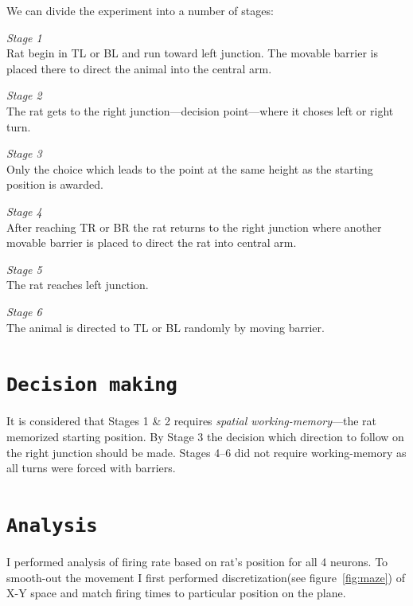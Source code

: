 \documentclass[12pt,a4paper,twocolumn]{article}
\begin{document}
We can divide the experiment into a number of stages:
\begin{description}
\item{\emph{Stage 1}} \hfill\\
Rat begin in TL or BL and run toward left junction. The movable barrier is placed there to direct the animal into the central arm.
\item{\emph{Stage 2}} \hfill\\
The rat gets to the right junction---decision point---where it choses left or right turn.
\item{\emph{Stage 3}} \hfill\\
Only the choice which leads to the point at the same height as the starting position is awarded.
\item{\emph{Stage 4}} \hfill\\
After reaching TR or BR the rat returns to the right junction where another movable barrier is placed to direct the rat into central arm.
\item{\emph{Stage 5}} \hfill\\
The rat reaches left junction.
\item{\emph{Stage 6}} \hfill\\
The animal is directed to TL or BL randomly by moving barrier.
\end{description}


\section*{\texttt{Decision making}}
It is considered that Stages 1 \& 2 requires \emph{spatial working-memory}---the rat memorized starting position. By Stage 3 the decision which direction to follow on the right junction should be made. Stages 4--6 did not require working-memory as all turns were forced with barriers.\\

\section*{\texttt{Analysis}}
I performed analysis of firing rate based on rat's position for all 4 neurons. To smooth-out the movement I first performed discretization(see figure~\ref{fig:maze}) of X-Y space and match firing times to particular position on the plane.\\
\end{document}
